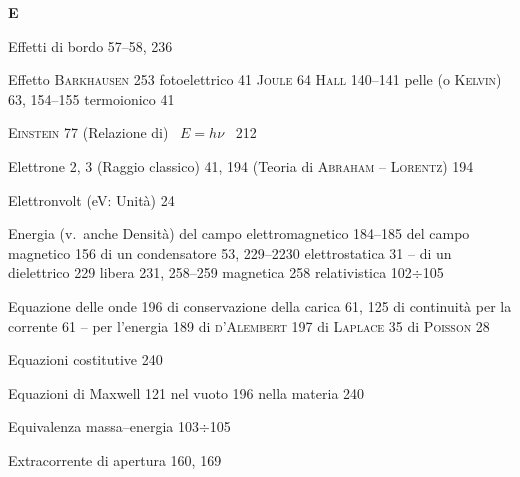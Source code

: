 \begin{theindex}
  \indexspace
  \item \textbf{E}
  \indexspace
  \item Effetti di bordo 57--58, 236
  \item Effetto
    \subitem \textsc{Barkhausen} 253
    \subitem fotoelettrico 41
    \subitem \textsc{Joule} 64
    \subitem \textsc{Hall} 140--141
    \subitem pelle (o \textsc{Kelvin}) 63, 154--155
    \subitem termoionico 41
  \item \textsc{Einstein} 77
    \subitem (Relazione di) \ $E=h\nu$ \ 212
  \item Elettrone 2, 3
    \subitem (Raggio classico) 41, 194
    \subitem (Teoria di \textsc{Abraham} -- \textsc{Lorentz}) 194
  \item Elettronvolt (eV: Unit\`a) 24
  \item Energia (v.\ anche Densit\`a)
    \subitem del campo elettromagnetico 184--185
    \subitem del campo magnetico 156
    \subitem di un condensatore 53, 229--2230
    \subitem elettrostatica 31
    \subitem -- di un dielettrico 229
    \subitem libera 231, 258--259
    \subitem magnetica 258
    \subitem relativistica 102$\div$105
  \item Equazione
    \subitem delle onde 196
    \subitem di conservazione della carica 61, 125
    \subitem di continuit\`a per la corrente 61
    \subitem -- per l'energia 189
    \subitem di \textsc{d'Alembert} 197
    \subitem di \textsc{Laplace} 35
    \subitem di \textsc{Poisson} 28
  \item Equazioni costitutive 240
  \item Equazioni di Maxwell 121
    \subitem nel vuoto 196
    \subitem nella materia 240
  \item Equivalenza massa--energia 103$\div$105
  \item Extracorrente di apertura 160, 169


\end{theindex}
